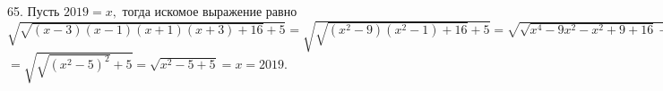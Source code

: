 65. Пусть $2019=x,$ тогда искомое выражение равно $\sqrt{\sqrt{(x-3)(x-1)(x+1)(x+3)+16}+5}=\sqrt{\sqrt{(x^2-9)(x^2-1)+16}+5}=
\sqrt{\sqrt{x^4-9x^2-x^2+9+16}+5}=\sqrt{\sqrt{x^4-10x^2+25}+5}=$\\$=\sqrt{\sqrt{(x^2-5)^2}+5}=\sqrt{x^2-5+5}=x=2019.$\\
